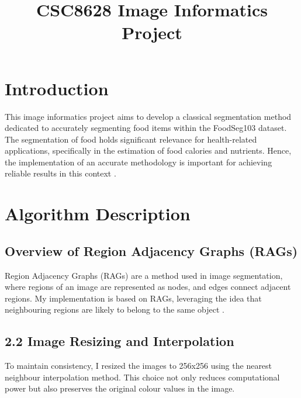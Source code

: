 \documentclass[conference]{IEEEtran}
\begin{document}
	
	\title{CSC8628 Image Informatics Project}
	
	\author{
	}		
	
	\maketitle
	
	\section{Introduction}
	This image informatics project aims to develop a classical segmentation 
	method dedicated to accurately segmenting food items within 
	the FoodSeg103 dataset. The segmentation of food holds significant 
	relevance for health-related applications, specifically in the estimation 
	of food calories and nutrients. Hence, the implementation of an accurate 
	methodology is important for achieving reliable results 
	in this context \cite{10.1145/3474085.3475201}.
	
 	\section{Algorithm Description}
 	
 	\subsection{Overview of Region Adjacency Graphs (RAGs)}
 	
 	Region Adjacency Graphs (RAGs) are a method used in image segmentation, where regions of an image are represented as nodes, and edges connect adjacent regions. My implementation is based on RAGs, leveraging the idea that neighbouring regions are likely to belong to the same object \cite{841950}\cite{868688}.

	\subsection{2.2 Image Resizing and Interpolation}
	
	To maintain consistency, I resized the images to 256x256 using the nearest neighbour interpolation method. This choice not only reduces computational power but also preserves the original colour values in the image.
 	
\end{document}
